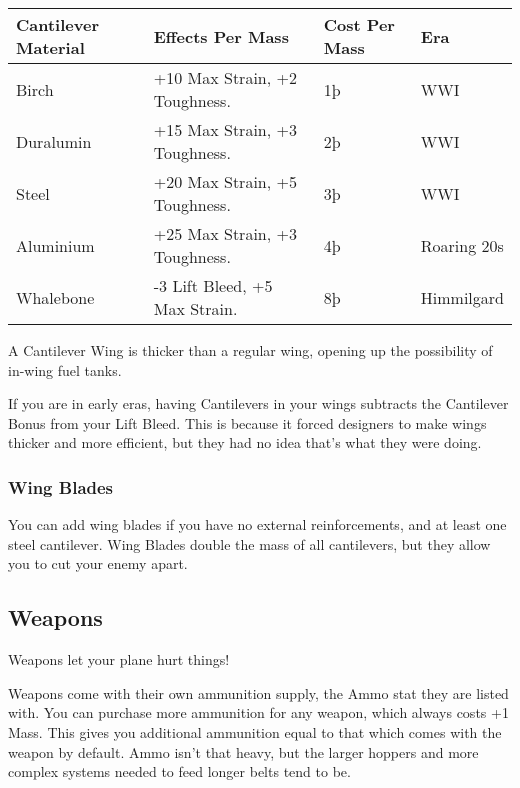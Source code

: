 \documentclass{article}
\begin{document}
\begin{tabular}{|l|l|l|l|}
    \hline
    Cantilever Material & Effects Per Mass              & Cost Per Mass & Era         \\\hline
    Birch               & +10 Max Strain, +2 Toughness. & 1þ            & WWI         \\\hline
    Duralumin           & +15 Max Strain, +3 Toughness. & 2þ            & WWI         \\\hline
    Steel               & +20 Max Strain, +5 Toughness. & 3þ            & WWI         \\\hline
    Aluminium           & +25 Max Strain, +3 Toughness. & 4þ            & Roaring 20s \\\hline
    Whalebone           & -3 Lift Bleed, +5 Max Strain. & 8þ            & Himmilgard  \\\hline
\end{tabular}

A Cantilever Wing is thicker than a regular wing, opening up the
possibility of in-wing fuel tanks.

If you are in early eras, having Cantilevers in your wings
subtracts the Cantilever Bonus from your Lift Bleed. This is because it
forced designers to make wings thicker and more efficient, but they had
no idea that's what they were doing.

\subsubsection{Wing Blades}
\label{_Wing Blades}

You can add wing blades if you have no external reinforcements, and at
least one steel cantilever. Wing Blades double the mass of all
cantilevers, but they allow you to cut your enemy apart.

\subsection{Weapons}
\label{_Weapons}

Weapons let your plane hurt things!

Weapons come with their own ammunition supply, the Ammo stat they are
listed with. You can purchase more ammunition for any weapon, which
always costs +1 Mass. This gives you additional ammunition equal to that
which comes with the weapon by default. Ammo isn't that heavy, but the
larger hoppers and more complex systems needed to feed longer belts tend
to be.
\end{document}

